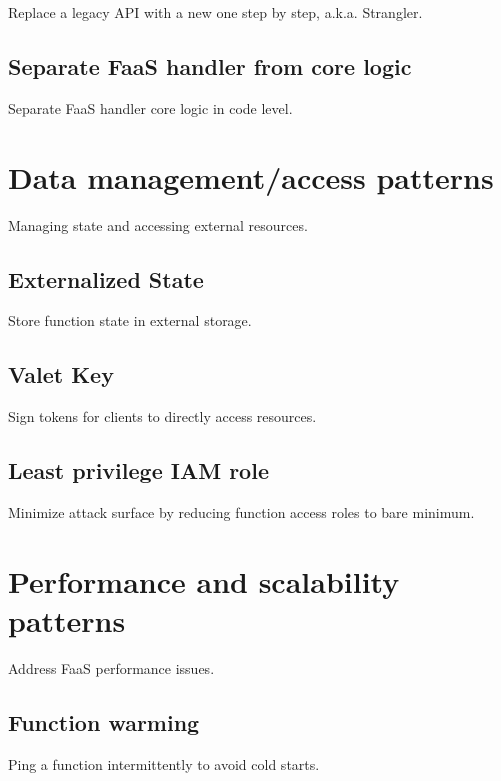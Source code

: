 Replace a legacy API with a new one step by step, a.k.a. Strangler.

\subsection{Separate FaaS handler from core logic} \label
{subsec:separateHandler}

Separate FaaS handler core logic in code level.

\section{Data management/access patterns} \label{sec:dataManagementPatterns}

Managing state and accessing external resources.

\subsection{Externalized State} \label{subsec:externalizedState}

Store function state in external storage.

\subsection{Valet Key} \label{subsec:valetKey}

Sign tokens for clients to directly access resources.

\subsection{Least privilege IAM role} \label{subsec:LeastprivilegeIAMrole}

Minimize attack surface by reducing function access roles to bare minimum.

\section{Performance and scalability patterns} \label{sec:perfPatterns}

Address FaaS performance issues.

\subsection{Function warming} \label{subsec:FunctionWarming}

Ping a function intermittently to avoid cold starts.

